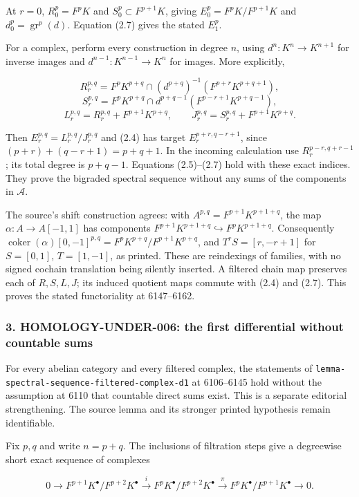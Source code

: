 \documentclass[11pt]{article}
\begin{document}
At \(r=0\), \(R_0^p=F^pK\) and \(S_0^p\subset F^{p+1}K\), giving \(E_0^p=F^pK/F^{p+1}K\) and \(d_0^p=\operatorname{gr}^p(d)\). Equation (2.7) gives the stated \(E_1^p\).

For a complex, perform every construction in degree \(n\), using \(d^n:K^n\to K^{n+1}\) for inverse images and \(d^{n-1}:K^{n-1}\to K^n\) for images. More explicitly,

\[
R_r^{p,q}=F^pK^{p+q}\cap(d^{p+q})^{-1}(F^{p+r}K^{p+q+1}),
\] \[
S_r^{p,q}=F^pK^{p+q}\cap d^{p+q-1}(F^{p-r+1}K^{p+q-1}),
\] \[
L_r^{p,q}=R_r^{p,q}+F^{p+1}K^{p+q},\qquad
J_r^{p,q}=S_r^{p,q}+F^{p+1}K^{p+q}.
\]

Then \(E_r^{p,q}=L_r^{p,q}/J_r^{p,q}\) and (2.4) has target \(E_r^{p+r,q-r+1}\), since \((p+r)+(q-r+1)=p+q+1\). In the incoming calculation use \(R_r^{p-r,q+r-1}\); its total degree is \(p+q-1\). Equations (2.5)--(2.7) hold with these exact indices. They prove the bigraded spectral sequence without any sums of the components in \(\mathcal A\).

The source's shift construction agrees: with \(A^{p,q}=F^{p+1}K^{p+1+q}\), the map \(\alpha:A\to A[-1,1]\) has components \(F^{p+1}K^{p+1+q}\hookrightarrow F^pK^{p+1+q}\). Consequently \(\operatorname{coker}(\alpha)[0,-1]^{p,q}
=F^pK^{p+q}/F^{p+1}K^{p+q}\), and \(T^rS=[r,-r+1]\) for \(S=[0,1]\), \(T=[1,-1]\), as printed. These are reindexings of families, with no signed cochain translation being silently inserted. A filtered chain map preserves each of \(R,S,L,J\); its induced quotient maps commute with (2.4) and (2.7). This proves the stated functoriality at 6147--6162.

\subsubsection{3. HOMOLOGY-UNDER-006: the first differential without countable sums}\label{homology-under-006-the-first-differential-without-countable-sums}

For every abelian category and every filtered complex, the statements of \texttt{lemma-spectral-sequence-filtered-complex-d1} at 6106--6145 hold without the assumption at 6110 that countable direct sums exist. This is a separate editorial strengthening. The source lemma and its stronger printed hypothesis remain identifiable.

Fix \(p,q\) and write \(n=p+q\). The inclusions of filtration steps give a degreewise short exact sequence of complexes

\[
0\longrightarrow F^{p+1}K^\bullet/F^{p+2}K^\bullet
\xrightarrow{i}F^pK^\bullet/F^{p+2}K^\bullet
\xrightarrow{\pi}F^pK^\bullet/F^{p+1}K^\bullet
\longrightarrow0.                         \tag{3.1}
\]
\end{document}
